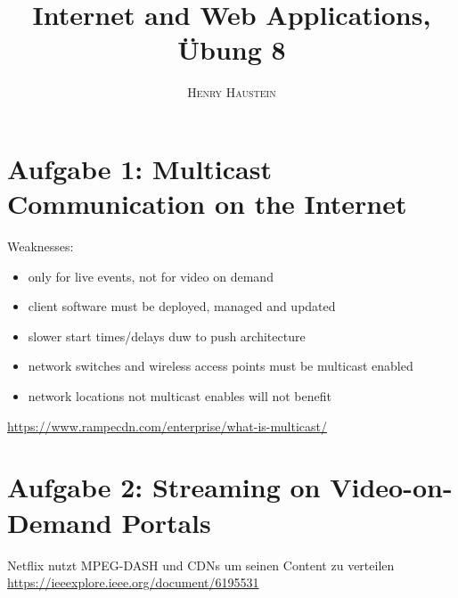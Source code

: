\documentclass{article}
\title{\textbf{Internet and Web Applications, Übung 8}}
\author{\textsc{Henry Haustein}}
\date{}
\begin{document}
	\maketitle
	
	\section*{Aufgabe 1: Multicast Communication on the Internet}
	Weaknesses:
	\begin{itemize}
		\item only for live events, not for video on demand
		\item client software must be deployed, managed and updated
		\item slower start times/delays duw to push architecture
		\item network switches and wireless access points must be multicast enabled
		\item network locations not multicast enables will not benefit
	\end{itemize}
	\url{https://www.rampecdn.com/enterprise/what-is-multicast/}
	
	\section*{Aufgabe 2: Streaming on Video-on-Demand Portals}
	Netflix nutzt MPEG-DASH und CDNs um seinen Content zu verteilen \\
	\url{https://ieeexplore.ieee.org/document/6195531}
	
\end{document}
